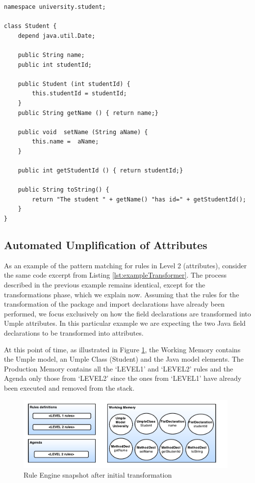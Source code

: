 \begin{lstlisting}[style=umpleOut, label=lst:level1exampleGenerator, caption=Umple code generated -- Level 1]
namespace university.student;

class Student {
	depend java.util.Date;
	
    public String name;
    public int studentId;
    
    public Student (int studentId) {
    	this.studentId = studentId;
    }
    public String getName () { return name;}
    
    public void  setName (String aName) { 
    	this.name =  aName;
    }
   
    public int getStudentId () { return studentId;}

    public String toString() {
    	return "The student " + getName() "has id=" + getStudentId();
    }
}   
\end{lstlisting}

\subsection{Automated Umplification of Attributes}

As an example of the pattern matching for rules in Level 2 (attributes), consider the same code excerpt from Listing \ref{lst:exampleTransformer}. The process described in the previous example remains identical, except for the transformations phase, which we explain now. Assuming that the rules for the transformation of the package and import declarations have already been performed, we focus exclusively on how the field declarations are transformed into Umple attributes. In this particular example we are expecting the two Java field declarations to be transformed into attributes. 

At this point of time, as illustrated in Figure \ref{fig:ruleModel2}, the Working Memory contains the Umple model, an Umple Class (Student) and the Java model elements. The Production Memory contains all the `LEVEL1' and `LEVEL2' rules and the Agenda only those from `LEVEL2' since the ones from `LEVEL1' have already been executed and removed from the stack.

\begin{figure}[h]
\centering
\includegraphics[width=0.98\textwidth]{Figures/ruleModel2.pdf}
\caption{Rule Engine snapshot after initial transformation}
\label{fig:ruleModel2}
\end{figure}


